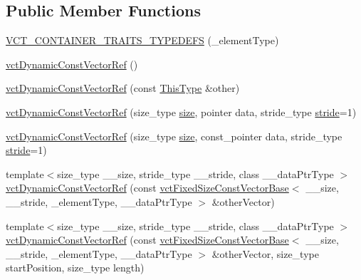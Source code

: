 \subsection*{Public Member Functions}
\begin{DoxyCompactItemize}
\item 
\hyperlink{classvct_dynamic_const_vector_ref_af5a1af086a71a1b9192b759c5d307390}{V\+C\+T\+\_\+\+C\+O\+N\+T\+A\+I\+N\+E\+R\+\_\+\+T\+R\+A\+I\+T\+S\+\_\+\+T\+Y\+P\+E\+D\+E\+F\+S} (\+\_\+element\+Type)
\item 
\hyperlink{classvct_dynamic_const_vector_ref_a6a664d6feac7f6b9ec7e6102a8752383}{vct\+Dynamic\+Const\+Vector\+Ref} ()
\item 
\hyperlink{classvct_dynamic_const_vector_ref_a9404543cc8b25da05266c6c58298cf02}{vct\+Dynamic\+Const\+Vector\+Ref} (const \hyperlink{classvct_dynamic_const_vector_ref_a8da0588e2e355e6224badfd42845195e}{This\+Type} \&other)
\item 
\hyperlink{classvct_dynamic_const_vector_ref_a15a2a61ae67187f59328e0b5af31b391}{vct\+Dynamic\+Const\+Vector\+Ref} (size\+\_\+type \hyperlink{classvct_dynamic_const_vector_base_a79950d8cced7fd4e790d9ac2ca1c43a7}{size}, pointer data, stride\+\_\+type \hyperlink{classvct_dynamic_const_vector_base_af0440ce847480b353e9f85edccc03158}{stride}=1)
\item 
\hyperlink{classvct_dynamic_const_vector_ref_aa21a63048cb504dc638afd7d3ce088cd}{vct\+Dynamic\+Const\+Vector\+Ref} (size\+\_\+type \hyperlink{classvct_dynamic_const_vector_base_a79950d8cced7fd4e790d9ac2ca1c43a7}{size}, const\+\_\+pointer data, stride\+\_\+type \hyperlink{classvct_dynamic_const_vector_base_af0440ce847480b353e9f85edccc03158}{stride}=1)
\item 
{\footnotesize template$<$size\+\_\+type \+\_\+\+\_\+size, stride\+\_\+type \+\_\+\+\_\+stride, class \+\_\+\+\_\+data\+Ptr\+Type $>$ }\\\hyperlink{classvct_dynamic_const_vector_ref_a21ce50c5b6432902022f1db81cf58c45}{vct\+Dynamic\+Const\+Vector\+Ref} (const \hyperlink{classvct_fixed_size_const_vector_base}{vct\+Fixed\+Size\+Const\+Vector\+Base}$<$ \+\_\+\+\_\+size, \+\_\+\+\_\+stride, \+\_\+element\+Type, \+\_\+\+\_\+data\+Ptr\+Type $>$ \&other\+Vector)
\item 
{\footnotesize template$<$size\+\_\+type \+\_\+\+\_\+size, stride\+\_\+type \+\_\+\+\_\+stride, class \+\_\+\+\_\+data\+Ptr\+Type $>$ }\\\hyperlink{classvct_dynamic_const_vector_ref_a6ee034fdbf22c6fd16e92dc26f393d81}{vct\+Dynamic\+Const\+Vector\+Ref} (const \hyperlink{classvct_fixed_size_const_vector_base}{vct\+Fixed\+Size\+Const\+Vector\+Base}$<$ \+\_\+\+\_\+size, \+\_\+\+\_\+stride, \+\_\+element\+Type, \+\_\+\+\_\+data\+Ptr\+Type $>$ \&other\+Vector, size\+\_\+type start\+Position, size\+\_\+type length)

\end{DoxyCompactItemize}
